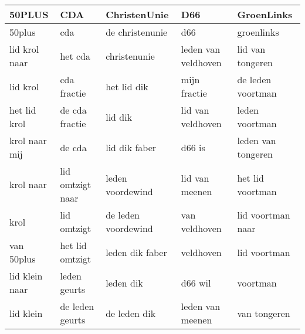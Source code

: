 \begin{tabular}{lllll}
\toprule
         50PLUS &               CDA &         ChristenUnie &                  D66 &          GroenLinks \\
\midrule
         50plus &               cda &      de christenunie &                  d66 &          groenlinks \\
  lid krol naar &           het cda &         christenunie &  leden van veldhoven &    lid van tongeren \\
       lid krol &       cda fractie &          het lid dik &         mijn fractie &   de leden voortman \\
   het lid krol &    de cda fractie &              lid dik &    lid van veldhoven &      leden voortman \\
  krol naar mij &            de cda &        lid dik faber &               d66 is &  leden van tongeren \\
      krol naar &  lid omtzigt naar &     leden voordewind &       lid van meenen &    het lid voortman \\
           krol &       lid omtzigt &  de leden voordewind &        van veldhoven &   lid voortman naar \\
     van 50plus &   het lid omtzigt &      leden dik faber &            veldhoven &        lid voortman \\
 lid klein naar &      leden geurts &            leden dik &              d66 wil &            voortman \\
      lid klein &   de leden geurts &         de leden dik &     leden van meenen &        van tongeren \\
\bottomrule
\end{tabular}
